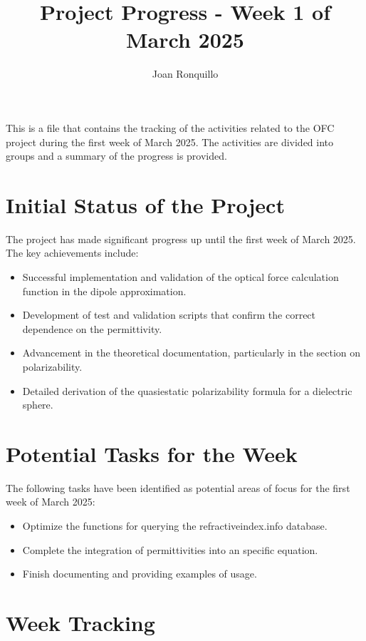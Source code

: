 \documentclass{article}
\begin{document}
\author{Joan Ronquillo}

\title{Project Progress - Week 1 of March 2025}
\maketitle

This is a file that contains the tracking of the activities related to the OFC project during the first week of March 2025.
The activities are divided into groups and a summary of the progress is provided.

\section{Initial Status of the Project}
The project has made significant progress up until the first week of March 2025. The key achievements include:

\begin{itemize}
    \item Successful implementation and validation of the optical force calculation function in the dipole approximation.
    \item Development of test and validation scripts that confirm the correct dependence on the permittivity.
    \item Advancement in the theoretical documentation, particularly in the section on polarizability.
    \item Detailed derivation of the quasiestatic polarizability formula for a dielectric sphere.
\end{itemize}

\section{Potential Tasks for the Week}
The following tasks have been identified as potential areas of focus for the first week of March 2025:
\begin{itemize}
    \item Optimize the functions for querying the refractiveindex.info database.
    \item Complete the integration of permittivities into an specific equation.
    \item Finish documenting and providing examples of usage.
\end{itemize}

\section{Week Tracking}
\end{document}
